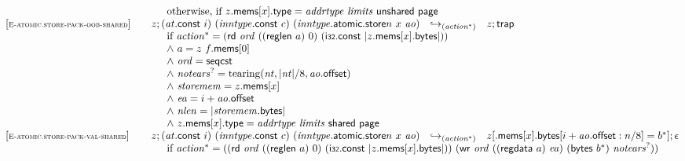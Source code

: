 $$\begin{array}[t]{@{}lrcl@{}l@{}}
& \multicolumn{4}{@{}l@{}}{\quad
\quad \mbox{otherwise, if}~ z{.}\mathsf{mems}{}[x]{.}\mathsf{type} = {\mathit{addrtype}}~{\mathit{limits}}~\mathsf{unshared}~\mathsf{page}
} \\
{[\textsc{\scriptsize E{-}atomic.store{-}pack{-}oob{-}shared}]} \quad & z ; ({\mathit{at}}{.}\mathsf{const}~i)~({\mathit{inntype}}{.}\mathsf{const}~c)~({{\mathit{inntype}}{.}\mathsf{atomic}{.}\mathsf{store}}{n}~x~{\mathit{ao}}) & {\hookrightarrow}_{({{\mathit{action}}^\ast})} {} & z ; \mathsf{trap} &  \\
& \multicolumn{4}{@{}l@{}}{\quad
\quad
\begin{array}[t]{@{}l@{}}
\mbox{if}~ {{\mathit{action}}^\ast} = (\mathsf{rd}~{\mathit{ord}}~((\mathsf{reglen}~a)~0)~(\mathsf{i{\scriptstyle 32}}{.}\mathsf{const}~{|z{.}\mathsf{mems}{}[x]{.}\mathsf{bytes}|})) \\
{\land}~ a = z~f{.}\mathsf{mems}{}[0] \\
{\land}~ {\mathit{ord}} = \mathsf{seqcst} \\
{\land}~ {{\mathit{notears}}^?} = {\mathrm{tearing}}({\mathit{nt}}, {|{\mathit{nt}}|} / 8, {\mathit{ao}}{.}\mathsf{offset}) \\
{\land}~ {\mathit{storemem}} = z{.}\mathsf{mems}{}[x] \\
{\land}~ {\mathit{ea}} = i + {\mathit{ao}}{.}\mathsf{offset} \\
{\land}~ {\mathit{nlen}} = {|{\mathit{storemem}}{.}\mathsf{bytes}|} \\
{\land}~ z{.}\mathsf{mems}{}[x]{.}\mathsf{type} = {\mathit{addrtype}}~{\mathit{limits}}~\mathsf{shared}~\mathsf{page} \\
\end{array}
} \\
{[\textsc{\scriptsize E{-}atomic.store{-}pack{-}val{-}shared}]} \quad & z ; ({\mathit{at}}{.}\mathsf{const}~i)~({\mathit{inntype}}{.}\mathsf{const}~c)~({{\mathit{inntype}}{.}\mathsf{atomic}{.}\mathsf{store}}{n}~x~{\mathit{ao}}) & {\hookrightarrow}_{({{\mathit{action}}^\ast})} {} & z{}[{.}\mathsf{mems}{}[x]{.}\mathsf{bytes}{}[i + {\mathit{ao}}{.}\mathsf{offset} : n / 8] = {b^\ast}] ; \epsilon &  \\
& \multicolumn{4}{@{}l@{}}{\quad
\quad
\begin{array}[t]{@{}l@{}}
\mbox{if}~ {{\mathit{action}}^\ast} = ((\mathsf{rd}~{\mathit{ord}}~((\mathsf{reglen}~a)~0)~(\mathsf{i{\scriptstyle 32}}{.}\mathsf{const}~{|z{.}\mathsf{mems}{}[x]{.}\mathsf{bytes}|}))~(\mathsf{wr}~{\mathit{ord}}~((\mathsf{regdata}~a)~{\mathit{ea}})~(\mathsf{bytes}~{b^\ast})~{{\mathit{notears}}^?})) \\

\end{array}}
\end{array}$$
